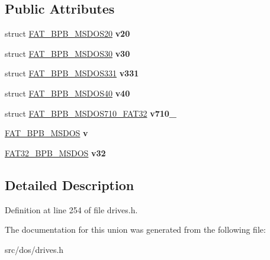 \subsection*{Public Attributes}
\begin{DoxyCompactItemize}
\item 
\hypertarget{unionFAT__BootSector_1_1bpb__union__t_a3d752869cb6ae6e3a6eb2f985b891ac2}{struct \hyperlink{structFAT__BPB__MSDOS20}{F\-A\-T\-\_\-\-B\-P\-B\-\_\-\-M\-S\-D\-O\-S20} {\bfseries v20}}\label{unionFAT__BootSector_1_1bpb__union__t_a3d752869cb6ae6e3a6eb2f985b891ac2}

\item 
\hypertarget{unionFAT__BootSector_1_1bpb__union__t_a0621c562cd7a501755dc0ef209571bdf}{struct \hyperlink{structFAT__BPB__MSDOS30}{F\-A\-T\-\_\-\-B\-P\-B\-\_\-\-M\-S\-D\-O\-S30} {\bfseries v30}}\label{unionFAT__BootSector_1_1bpb__union__t_a0621c562cd7a501755dc0ef209571bdf}

\item 
\hypertarget{unionFAT__BootSector_1_1bpb__union__t_abdd0c9199ba50298b73df9b02f6bd628}{struct \hyperlink{structFAT__BPB__MSDOS331}{F\-A\-T\-\_\-\-B\-P\-B\-\_\-\-M\-S\-D\-O\-S331} {\bfseries v331}}\label{unionFAT__BootSector_1_1bpb__union__t_abdd0c9199ba50298b73df9b02f6bd628}

\item 
\hypertarget{unionFAT__BootSector_1_1bpb__union__t_af136673ba72c07841ce51db0749b869f}{struct \hyperlink{structFAT__BPB__MSDOS40}{F\-A\-T\-\_\-\-B\-P\-B\-\_\-\-M\-S\-D\-O\-S40} {\bfseries v40}}\label{unionFAT__BootSector_1_1bpb__union__t_af136673ba72c07841ce51db0749b869f}

\item 
\hypertarget{unionFAT__BootSector_1_1bpb__union__t_a15fd4905afe2f1ab4112215447ab4310}{struct \hyperlink{structFAT__BPB__MSDOS710__FAT32}{F\-A\-T\-\_\-\-B\-P\-B\-\_\-\-M\-S\-D\-O\-S710\-\_\-\-F\-A\-T32} {\bfseries v710\-\_}}\label{unionFAT__BootSector_1_1bpb__union__t_a15fd4905afe2f1ab4112215447ab4310}

\item 
\hypertarget{unionFAT__BootSector_1_1bpb__union__t_acbf4874c0a6e504e9ab547b364be6a74}{\hyperlink{structFAT__BPB__MSDOS40}{F\-A\-T\-\_\-\-B\-P\-B\-\_\-\-M\-S\-D\-O\-S} {\bfseries v}}\label{unionFAT__BootSector_1_1bpb__union__t_acbf4874c0a6e504e9ab547b364be6a74}

\item 
\hypertarget{unionFAT__BootSector_1_1bpb__union__t_ad3738b2a193d957c605890541a8078ec}{\hyperlink{structFAT__BPB__MSDOS710__FAT32}{F\-A\-T32\-\_\-\-B\-P\-B\-\_\-\-M\-S\-D\-O\-S} {\bfseries v32}}\label{unionFAT__BootSector_1_1bpb__union__t_ad3738b2a193d957c605890541a8078ec}

\end{DoxyCompactItemize}


\subsection{Detailed Description}


Definition at line 254 of file drives.\-h.



The documentation for this union was generated from the following file\-:\begin{DoxyCompactItemize}
\item 
src/dos/drives.\-h\end{DoxyCompactItemize}
